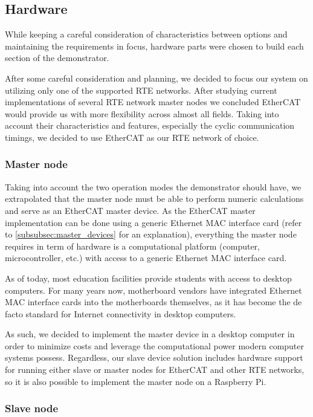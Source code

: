 \subsection{Hardware} \label{sec:proposed-hardware}

While keeping a careful consideration of characteristics between options and maintaining the requirements in focus, hardware parts were chosen to build each section of the demonstrator.

After some careful consideration and planning, we decided to focus our system on utilizing only one of the supported RTE networks.
After studying current implementations of several RTE network master nodes we concluded EtherCAT \cite{protocol:ethercat} would provide us with more flexibility across almost all fields.
Taking into account their characteristics and features, especially the cyclic communication timings, we decided to use EtherCAT as our RTE network of choice.

\subsubsection{Master node}

Taking into account the two operation modes the demonstrator should have, we extrapolated that the master node must be able to perform numeric calculations and serve as an EtherCAT master device.
As the EtherCAT master implementation can be done using a generic Ethernet MAC interface card (refer to \autoref{subsubsec:master_devices} for an explanation), everything the master node requires in term of hardware is a computational platform (computer, microcontroller, etc.) with access to a generic Ethernet MAC interface card.

As of today, most education facilities provide students with access to desktop computers.
For many years now, motherboard vendors have integrated Ethernet MAC interface cards into the motherboards themselves, as it has become the de facto standard for Internet connectivity in desktop computers.

As such, we decided to implement the master device in a desktop computer in order to minimize costs and leverage the computational power modern computer systems possess.
Regardless, our slave device solution includes hardware support for running either slave or master nodes for EtherCAT and other RTE networks, so it is also possible to implement the master node on a Raspberry Pi.

\subsubsection{Slave node} \label{subsubsec:slave_hdw}

